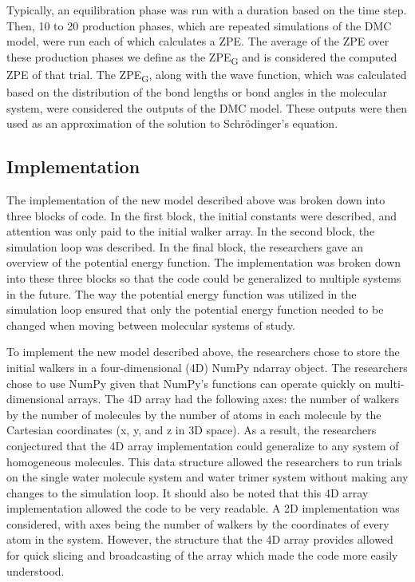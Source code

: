 \documentclass[journal=jacsat,manuscript=article]{achemso}
\begin{document}
Typically, an equilibration phase was run with a duration based on the time step. Then, 10 to 20 production phases, which are repeated simulations of the DMC model, were run each of which calculates a ZPE. The average of the ZPE over these production phases we define as the ZPE\textsubscript{G} and is considered the computed ZPE of that trial. The ZPE\textsubscript{G}, along with the wave function, which was calculated based on the distribution of the bond lengths or bond angles in the molecular system, were considered the outputs of the DMC model. These outputs were then used as an approximation of the solution to Schr\"odinger’s equation.

\subsection{Implementation}

The implementation of the new model described above was broken down into three blocks of code. In the first block, the initial constants were described, and attention was only paid to the initial walker array. In the second block, the simulation loop was described. In the final block, the researchers gave an overview of the potential energy function. The implementation was broken down into these three blocks so that the code could be generalized to multiple systems in the future. The way the potential energy function was utilized in the simulation loop ensured that only the potential energy function needed to be changed when moving between molecular systems of study. 

To implement the new model described above, the researchers chose to store the initial walkers in a four-dimensional (4D) NumPy ndarray object. The researchers chose to use NumPy given that NumPy’s functions can operate quickly on multi-dimensional arrays. The 4D array had the following axes: the number of walkers by the number of molecules by the number of atoms in each molecule by the Cartesian coordinates (x, y, and z in 3D space). As a result, the researchers conjectured that the 4D array implementation could generalize to any system of homogeneous molecules. This data structure allowed the researchers to run trials on the single water molecule system and water trimer system without making any changes to the simulation loop. It should also be noted that this 4D array implementation allowed the code to be very readable. A 2D implementation was considered, with axes being the number of walkers by the coordinates of every atom in the system. However, the structure that the 4D array provides allowed for quick slicing and broadcasting of the array which made the code more easily understood.
\end{document}
